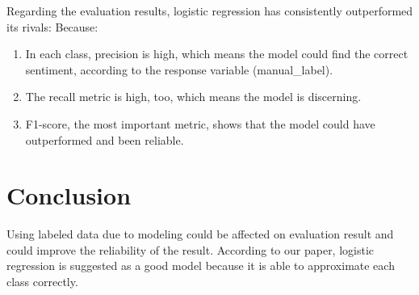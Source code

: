 \documentclass[twoside]{article}
\begin{document}
Regarding the evaluation results, logistic regression has consistently outperformed its rivals:
Because:
\begin{enumerate}
	\item In each class, precision is high, which means the model could find the correct sentiment, according to the response variable (manual\_label).
	\item The recall metric is high, too, which means the model is discerning.
	\item F1-score, the most important metric, shows that the model could have outperformed and been reliable.
\end{enumerate}


\section*{Conclusion}   
Using labeled data due to modeling could be affected on evaluation result and could improve the reliability of the result. According to our paper, logistic regression is suggested as a good model because it is able to approximate each class correctly.




\clearpage 


\end{document}
